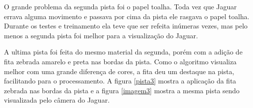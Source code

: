 O grande problema da segunda pista foi o papel toalha. Toda vez que Jaguar errava alguma movimento e passava por cima da pista ele rasgava o papel toalha. Durante os testes e treinamento ela teve que ser refeita inúmeras vezes, mas pelo menos a segunda pista foi melhor para a visualização do Jaguar. 

	\begin{figure}[H]
		\centering
\end{figure}

A ultima pista foi feita do mesmo material da segunda, porém com a adição de fita zebrada amarelo e preta nas bordas da pista. Como o algoritmo visualiza melhor com uma grande diferença de cores, a fita deu um destaque na pista, facilitando para o processamento. A figura \ref{pista3} mostra a aplicação da fita zebrada nas bordas da pista e a figura \ref{imagem3} mostra a mesma pista sendo visualizada pelo câmera do Jaguar.

	\begin{figure}[H]
		\centering
\end{figure}


